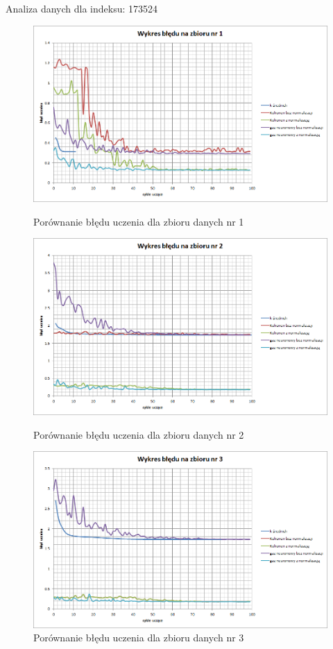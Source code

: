 \documentclass{classrep}
\begin{document}
\clearpage
Analiza danych dla indeksu: 173524


\begin{figure}[h]
	\centering
		\includegraphics[scale=0.55]{pictures/173524_1.png}
	\label{fig:173524_1}
	\caption{Porównanie błędu uczenia dla zbioru danych nr 1}
\end{figure}

\begin{figure}[h]
	\centering
		\includegraphics[scale=0.55]{pictures/173524_2.png}
	\label{fig:173524_2}
	\caption{Porównanie błędu uczenia dla zbioru danych nr 2}
\end{figure}

\begin{figure}[h]
	\centering
		\includegraphics[scale=0.55]{pictures/173524_3.png}
		\caption{Porównanie błędu uczenia dla zbioru danych nr 3}
	\label{fig:173524_3}
\end{figure}
\end{document}
